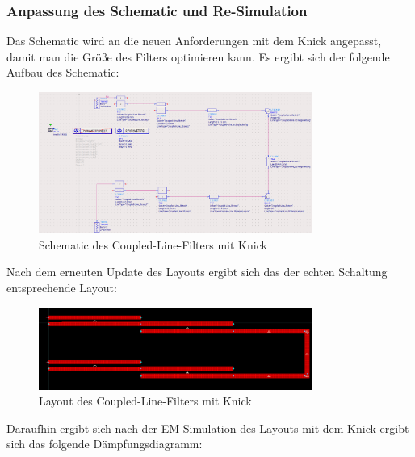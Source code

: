 \subsubsection{Anpassung des Schematic und Re-Simulation}
    Das Schematic wird an die neuen Anforderungen mit dem Knick angepasst, damit man die Größe des Filters optimieren kann. Es ergibt sich der folgende Aufbau des Schematic:
    \begin{figure}[H]
        \centering
        \includegraphics[width=0.8\textwidth]{Pictures/SchematicMitKnick.png}
        \caption{Schematic des Coupled-Line-Filters mit Knick}
    \end{figure}
    Nach dem erneuten Update des Layouts ergibt sich das der echten Schaltung entsprechende Layout:
    \begin{figure}[H]
        \centering
        \includegraphics[width=0.8\textwidth]{Pictures/LayoutmitKnick.png}
        \caption{Layout des Coupled-Line-Filters mit Knick}
    \end{figure}
    Daraufhin ergibt sich nach der EM-Simulation des Layouts mit dem Knick ergibt sich das folgende Dämpfungsdiagramm:
